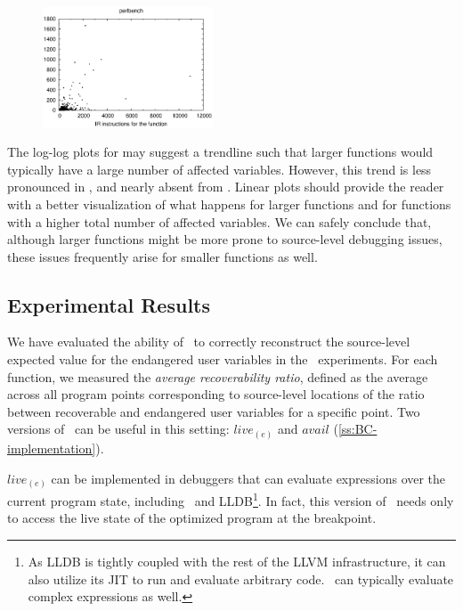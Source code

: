 \begin{figure}[!t]
\begin{center}
{\includegraphics[width=0.45\textwidth]{figures/CS-debug-tot-dead/tot-dead-perlbench-linear.eps}
}
\caption{\protect}
\end{center}
\end{figure}

The log-log plots for  may suggest a trendline such that larger functions would typically have a large number of affected variables. However, this trend is less pronounced in , and nearly absent from . Linear plots should provide the reader with a better visualization of what happens for larger functions and for functions with a higher total number of affected variables. We can safely conclude that, although larger functions might be more prone to source-level debugging issues, these issues frequently arise for smaller functions as well.

\subsection{Experimental Results}
We have evaluated the ability of \buildcomp\ to correctly reconstruct the source-level expected value for the endangered user variables in the \speccpu\ experiments. For each function, we measured the {\em average recoverability ratio}, defined as the average across all program points corresponding to source-level locations of the ratio between recoverable and endangered user variables for a specific point. Two versions of \reconstruct\ can be useful in this setting: $live_{(e)}$ and $avail$ (\mysection\ref{ss:BC-implementation}).

$live_{(e)}$ can be implemented in debuggers that can evaluate expressions over the current program state, including \gdb\ and LLDB\footnote{As LLDB is tightly coupled with the rest of the LLVM infrastructure, it can also utilize its JIT to run and evaluate arbitrary code. \gdb\ can typically evaluate complex expressions as well.}. In fact, this version of \reconstruct\ needs only to access the live state of the optimized program at the breakpoint.

